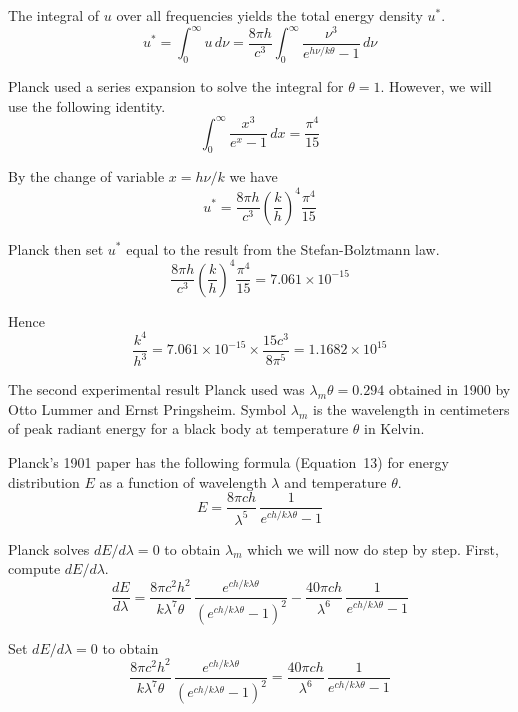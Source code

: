 \documentclass[12pt]{article}
\begin{document}
The integral of $u$ over all frequencies yields the total energy density $u^*$.
\begin{equation*}
u^{*}=\int_0^\infty u\,d\nu
=\frac{8\pi h}{c^3}\int_0^\infty\frac{\nu^3}{e^{h\nu/k\theta}-1}\,d\nu
\end{equation*}

Planck used a series expansion to solve the integral for $\theta=1$.
However, we will use the following identity.
\begin{equation*}
\int_0^\infty\frac{x^3}{e^x-1}\,dx=\frac{\pi^4}{15}
\end{equation*}

By the change of variable $x=h\nu/k$ we have
\begin{equation*}
u^*=\frac{8\pi h}{c^3}\left(\frac{k}{h}\right)^4\frac{\pi^4}{15}
\end{equation*}

Planck then set $u^*$ equal to the result from the Stefan-Bolztmann law.
\begin{equation*}
\frac{8\pi h}{c^3}\left(\frac{k}{h}\right)^4\frac{\pi^4}{15}=7.061\times10^{-15}
\end{equation*}

Hence
\begin{equation*}
\frac{k^4}{h^3}=7.061\times10^{-15}\times\frac{15c^3}{8\pi^5}=1.1682\times10^{15}
\end{equation*}

The second experimental result Planck used was $\lambda_m\theta=0.294$ obtained in 1900 by
Otto Lummer and Ernst Pringsheim.
Symbol $\lambda_m$ is the wavelength in centimeters
of peak radiant energy for a black body at temperature $\theta$ in Kelvin.

\bigskip
Planck's 1901 paper has the following formula (Equation~13)
for energy distribution $E$ as a function of wavelength $\lambda$ and temperature $\theta$.
\begin{equation*}
E=\frac{8\pi ch}{\lambda^5}\,\frac{1}{e^{ch/k\lambda\theta}-1}
\end{equation*}

Planck solves $dE/d\lambda=0$ to obtain $\lambda_m$ which we will now do step by step.
First, compute $dE/d\lambda$.
\begin{equation*}
\frac{dE}{d\lambda}
=\frac{8\pi c^2h^2}{k\lambda^7\theta}\,\frac{e^{ch/k\lambda\theta}}{(e^{ch/k\lambda\theta}-1)^2}
-\frac{40\pi ch}{\lambda^6}\,\frac{1}{e^{ch/k\lambda\theta}-1}
\end{equation*}

Set $dE/d\lambda=0$ to obtain
\begin{equation*}
\frac{8\pi c^2h^2}{k\lambda^7\theta}\,\frac{e^{ch/k\lambda\theta}}{(e^{ch/k\lambda\theta}-1)^2}
=\frac{40\pi ch}{\lambda^6}\,\frac{1}{e^{ch/k\lambda\theta}-1}
\end{equation*}
\end{document}
